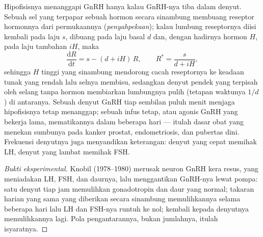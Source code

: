 \begin{proposition}\label{prop:b2:reproductive-hormones:pulses}
Hipofisisnya menanggapi GnRH hanya kalau GnRH-nya tiba dalam denyut.
Sebuah sel yang terpapar sebuah hormon secara sinambung membuang
reseptor hormonnya dari permukaannya (\emph{penyahpekaan}); kalau
lumbung reseptornya diisi kembali pada laju $s$, dibuang pada laju
basal $d$ dan, dengan hadirnya hormon $H$, pada laju tambahan $iH$,
maka
\[
\frac{\mathrm{d}R}{\mathrm{d}t} = s - (d + iH)\,R, \qquad R^* = \frac{s}{d + iH},
\]
sehingga $H$ tinggi yang sinambung mendorong cacah reseptornya ke
keadaan tunak yang rendah lalu selnya membisu, sedangkan denyut pendek
yang terpisah oleh selang tanpa hormon membiarkan lumbungnya pulih
(tetapan waktunya $1/d$) di antaranya. Sebuah denyut GnRH tiap sembilan
puluh menit menjaga hipofisisnya tetap menanggap; sebuah infus tetap,
atau agonis GnRH yang bekerja lama, mematikannya dalam beberapa hari
--- itulah dasar obat yang menekan sumbunya pada kanker prostat,
endometriosis, dan pubertas dini. Frekuensi denyutnya juga menyandikan
keterangan: denyut yang cepat memihak LH, denyut yang lambat memihak
FSH.
\end{proposition}
\begin{proof}[Bukti eksperimental]
Knobil (1978--1980) merusak neuron GnRH kera resus, yang meniadakan LH,
FSH, dan daurnya, lalu menggantikan GnRH-nya lewat pompa: satu denyut
tiap jam memulihkan gonadotropin dan daur  yang normal; takaran
harian yang sama yang diberikan secara sinambung memulihkannya selama
beberapa hari lalu LH dan FSH-nya runtuh ke nol; kembali kepada
denyutnya memulihkannya lagi. Pola pengantarannya, bukan jumlahnya,
itulah isyaratnya.
\end{proof}

